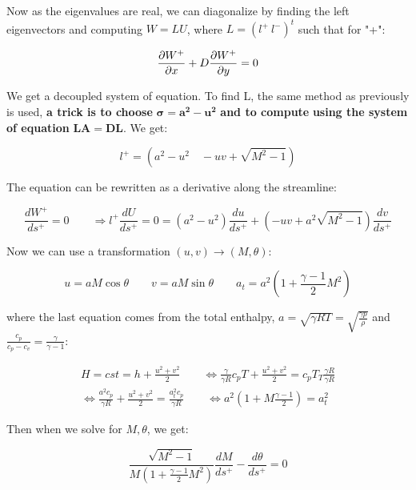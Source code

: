 	Now as the eigenvalues are real, we can diagonalize by finding the left eigenvectors and computing $W = LU$, where $L = (l^+ \ l^-)^t$ such that for "+": 
	
	\begin{equation}
	\frac{\D W^+}{\D x} + D\frac{\D W^+}{\D y} = 0
	\end{equation}
	
	We get a decoupled system of equation. To find L, the same method as previously is used, \textbf{a trick is to choose} $\bm{\sigma = a^2 - u^2}$ \textbf{and to compute} \bm{$\mu$} \textbf{using the system of equation} $\bm{LA = DL}$. We get: 
	
	\begin{equation}
	l^+ = (a^2 - u^2\quad -uv +\sqrt{M^2 -1})
	\end{equation}
	
	The equation can be rewritten as a derivative along the streamline: 
	
	\begin{equation}
	\frac{d W^+}{d s^+} =  0 \qquad \Rightarrow l^+ \frac{d U}{d s^+} = 0 = (a^2 - u^2 )\frac{d u}{d s^+} + (-uv + a^2\sqrt{M^2-1})\frac{dv}{ds^+}
	\end{equation}
	
	Now we can use a transformation $(u,v) \rightarrow (M, \theta)$: 
	
	\begin{equation}
	u = a M\cos \theta \qquad v = a M \sin \theta \qquad a_t = a^2 \left( 1+\frac{\gamma - 1}{2} M^2 \right)
	\end{equation}
	
	where the last equation comes from the total enthalpy, $a = \sqrt{\gamma R T} = \sqrt{\frac{\gamma p}{\rho}}$ and $\frac{c_p}{c_p - c_v}= \frac{\gamma}{\gamma - 1}$: 
	
	\begin{equation}
	\begin{array}{c}
	H = cst = h + \frac{u^2 + v^2}{2} \qquad \Leftrightarrow \frac{\gamma}{\gamma R}c_p T + \frac{u^2+v^2}{2} = c_p T_T \frac{\gamma R}{\gamma R} \\
	\Leftrightarrow \frac{a^2 c_p}{\gamma R} + \frac{u^2 + v^2}{2} = \frac{a^2_t c_p}{\gamma R} \qquad \Leftrightarrow a^2 \left( 1 + M\frac{\gamma -1 }{2} \right) = a^2_t
	\end{array}
	\end{equation}
	
	Then when we solve for $M, \theta$, we get: 
	
	\begin{equation}
	\frac{\sqrt{M^2-1}}{M \left(1+\frac{\gamma -1}{2}M^2\right)}\frac{dM}{ds^+} - \frac{d\theta }{ds^+} = 0
	\end{equation}
	

